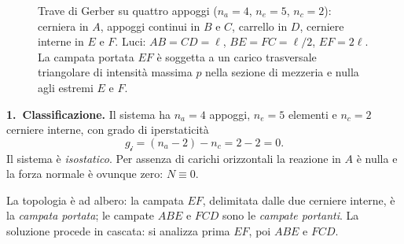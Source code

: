\begin{figure}[htbp]
\caption{Trave di Gerber su quattro appoggi ($n_a=4$, $n_e=5$,
	$n_c=2$): cerniera in $A$, appoggi continui in $B$ e $C$,
	carrello in $D$, cerniere interne in $E$ e $F$.
	Luci: $AB = CD = \ell$, $BE = FC = \ell/2$, $EF = 2\ell$.
	La campata portata $EF$ è soggetta a un carico trasversale
	triangolare di intensità massima $p$ nella sezione di mezzeria
	e nulla agli estremi $E$ e $F$.}
\label{fig:gerber_esempio_schema}
\end{figure}
\medskip
\noindent\textbf{1.~Classificazione.}
Il sistema ha $n_a = 4$ appoggi, $n_e = 5$ elementi e $n_c = 2$
cerniere interne, con grado di iperstaticità
\[
g_{\mathscr{i}} = (n_a - 2) - n_c = 2 - 2 = 0.
\]
Il sistema è \emph{isostatico}. Per assenza di carichi orizzontali
la reazione in $A$ è nulla e la forza normale è ovunque zero:
$N \equiv 0$.

La topologia è ad albero: la campata $EF$, delimitata dalle due
cerniere interne, è la \emph{campata portata}; le campate $ABE$
e $FCD$ sono le \emph{campate portanti}. La soluzione procede in
cascata: si analizza prima $EF$, poi $ABE$ e $FCD$.

